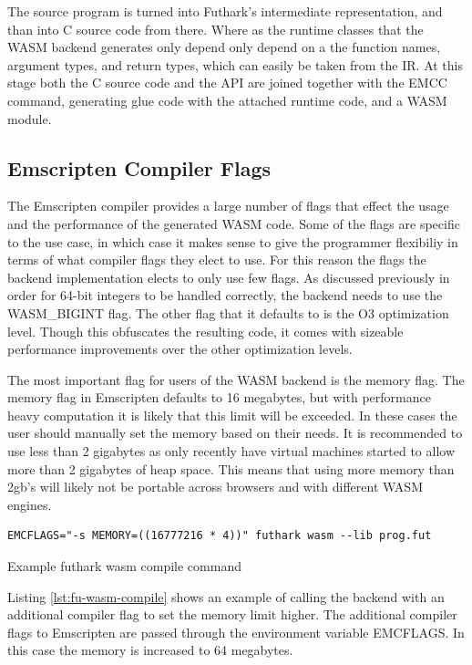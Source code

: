 \documentclass[11pt]{book}
\begin{document}
The source program is turned into Futhark's intermediate representation, and than into C source code from there. Where as the runtime classes that the WASM backend generates only depend only depend on a the function names, argument types, and return types, which can easily be taken from the IR. At this stage both the C source code and the API are joined together with the EMCC command, generating glue code with the attached runtime code, and a WASM module. 

\subsection{Emscripten Compiler Flags}
The Emscripten compiler provides a large number of flags that effect the usage and the performance of the generated WASM code. Some of the flags are specific to the use case, in which case it makes sense to give the programmer flexibiliy in terms of what compiler flags they elect to use. For this reason the flags the backend implementation elects to only use few flags. As discussed previously in order for 64-bit integers to be handled correctly, the backend needs to use the WASM\_BIGINT flag. The other flag that it defaults to is the O3 optimization level. Though this obfuscates the resulting code, it comes with sizeable performance improvements over the other optimization levels.

The most important flag for users of the WASM backend is the memory flag. The memory flag in Emscripten defaults to 16 megabytes, but with performance heavy computation it is likely that this limit will be exceeded. In these cases the user should manually set the memory based on their needs. It is recommended to use less than 2 gigabytes as only recently have virtual machines started to allow more than 2 gigabytes of heap space. This means that using more memory than 2gb's will likely not be portable across browsers and with different WASM engines. 

\begin{listing}
\begin{verbatim}
EMCFLAGS="-s MEMORY=((16777216 * 4))" futhark wasm --lib prog.fut
\end{verbatim}
\caption{Example futhark wasm compile command}
\label{lst:fu-wasm-compile}
\end{listing}

Listing \ref{lst:fu-wasm-compile} shows an example of calling the backend with an additional compiler flag to set the memory limit higher. The additional compiler flags to Emscripten are passed through the environment variable EMCFLAGS. In this case the memory is increased to 64 megabytes.
\end{document}

